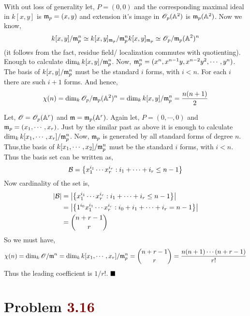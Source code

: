 \documentclass[12pt]{article}
\begin{document}
 With out loss of generality let, $P=(0,0)$ and the corresponding maximal ideal in $k[x,y]$ is $\mathfrak{m}_p =(x,y)$ and extension it's image in $\mathscr{O}_p(\mathbb{A}^2)$ is $\mathfrak{m}_p(\mathbb{A}^2)$. Now we know, $$k[x,y]/\mathfrak{m}_p^n \simeq k[x,y]_{\mathfrak{m}_p}/ \mathfrak{m}_p^n k[x,y]_{\mathfrak{m}_p} \simeq \mathscr{O}_p/\mathfrak{m}_p(\mathbb{A}^2)^n$$ (it follows from the fact, residue field/ localization commutes with quotienting). Enough to calculate $\dim_k k[x,y]/\mathfrak{m}_p^n$. Now, $\mathfrak{m}_p^n = (x^n,x^{n-1}y,x^{n-2}y^2,\cdots,y^n)$. The basis of $k[x,y]/\mathfrak{m}_p^n$ must be the standard $i$ forms, with $i<n$. For each $i$ there are such $i+1$ forms. And hence, $$\chi(n) = \dim_k \mathscr{O}_p/\mathfrak{m}_p(\mathbb{A}^2)^n = \dim_k k[x,y]/\mathfrak{m}_p^n = \frac{n(n+1)}{2}$$

\vspace*{0.2cm}


\noindent {} Let, $\mathscr{O} = \mathscr{O}_p(\mathbb{A}^r)$ and $\mathfrak{m} = \mathfrak{m}_p(\mathbb{A}^r)$. Again let, $P=(0,\cdots,0)$ and $\mathfrak{m}_p =(x_1,\cdots,x_r)$. Just by the similar past as above it is enough to calculate $\dim_k k[x_1,\cdots,x_r]/\mathfrak{m}_p^n$. Now, $\mathfrak{m}_p$ is generated by all standard forms of degree $n$. Thus,the basis of $k[x_1,\cdots,x_2]/\mathfrak{m}_p^n$ must be the standard $i$ forms, with $i<n$. Thus the basis set can be written as,
$$\mathcal{B} = \qty{x_1^{i_1}\cdots x_r^{i_r}:i_1+\cdots +i_r \leq n-1}$$ Now cardinality of the set is, \begin{align*}
    \abs{\mathcal{B}} & = \abs{\qty{x_1^{i_1}\cdots x_r^{i_r}:i_1+\cdots +i_r \leq n-1}}        \\
                      & = \abs{\qty{1^{i_0}x_1^{i_1}\cdots x_r^{i_r}:i_0+i_1+\cdots +i_r =n-1}} \\
                      & = \binom{n+r-1}{r}
\end{align*}
So we must have,  $$\chi(n) = \dim_k \mathscr{O}/\mathfrak{m}^n= \dim_k k[x_1,\cdots,x_r]/\mathfrak{m}_p^n = \binom{n+r-1}{r}= \frac{n(n+1)\cdots (n+r-1)}{r!}$$ Thus the leading coefficient is $1/r!$. $\hfill \blacksquare$

\section{Problem \textcolor{maroon}{3.16}} %
\end{document}
